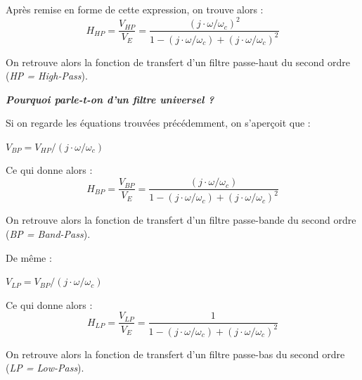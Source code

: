 \documentclass[a4paper,french]{paper}
\begin{document}
\medskip

Après remise en forme de cette expression, on trouve alors :
$$\boxed{ H_{HP} = \frac{V_{HP}}{V_E} = \frac{(j \cdot \omega / \omega_c)^2}{1 - (j \cdot \omega / \omega_c) + (j \cdot \omega / \omega_c)^2} }$$

On retrouve alors la fonction de transfert d'un filtre passe-haut du second ordre (\textit{HP = High-Pass}).

\textbf{\textit{Pourquoi parle-t-on d'un filtre universel ?}}

Si on regarde les équations trouvées précédemment, on s'aperçoit que :

$V_{BP} = V_{HP} / (j \cdot \omega / \omega_c)$ 

Ce qui donne alors : 
$$\boxed{H_{BP} = \frac{V_{BP}}{V_E} = \frac{(j \cdot \omega / \omega_c)}{1 - (j \cdot \omega / \omega_c) + (j \cdot \omega / \omega_c)^2}}$$

On retrouve alors la fonction de transfert d'un filtre passe-bande du second ordre (\textit{BP = Band-Pass}).

\medskip

De même :

$V_{LP} = V_{BP} / (j \cdot \omega / \omega_c)$ 

Ce qui donne alors : 
$$\boxed{H_{LP} = \frac{V_{LP}}{V_E} = \frac{1}{1 - (j \cdot \omega / \omega_c) + (j \cdot \omega / \omega_c)^2}}$$

On retrouve alors la fonction de transfert d'un filtre passe-bas du second ordre (\textit{LP = Low-Pass}).

\newpage
\end{document}
